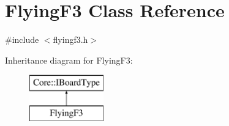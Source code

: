 \hypertarget{class_flying_f3}{\section{\-Flying\-F3 \-Class \-Reference}
\label{class_flying_f3}
}


{\ttfamily \#include $<$flyingf3.\-h$>$}

\-Inheritance diagram for \-Flying\-F3\-:\begin{figure}[H]
\begin{center}
\leavevmode
\includegraphics[height=2.000000cm]{class_flying_f3}
\end{center}
\end{figure}
